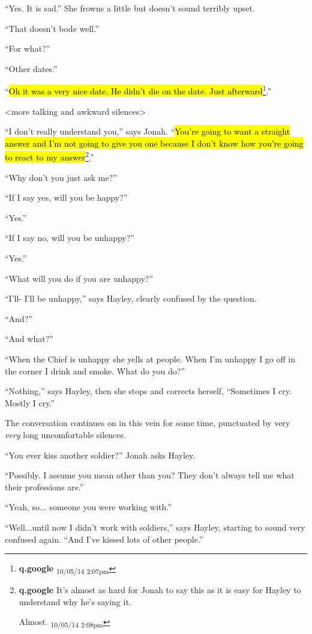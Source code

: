 ``Yes. It is sad.''  She frowns a little but doesn't sound terribly upset.

``That doesn't bode well.''

``For what?''

``Other dates.''

``\hl{Oh it was a very nice date.  He didn't die on the date.  Just afterward}\footnote{\textbf{q.google } \textsubscript{10/05/14 2:07pm}}.''

\textless more talking and awkward silences\textgreater 

``I don't really understand you,'' says Jonah.  ``\hl{You're going to want a straight answer and I'm not going to give you one because I don't know how you're going to react to my answer}\footnote{\textbf{q.google }It's almost as hard for Jonah to say this as it is easy for Hayley to understand why he's saying it.

Almost. \textsubscript{10/05/14 2:08pm}}.''

``Why don't you just ask me?''

``If I say yes, will you be happy?''

``Yes.''

``If I say no, will you be unhappy?''

``Yes.''

``What will you do if you are unhappy?''

``I'll- I'll be unhappy,'' says Hayley, clearly confused by the question.

``And?''

``And what?''

``When the Chief is unhappy she yells at people.  When I'm unhappy I go off in the corner I drink and smoke. What do you do?''

``Nothing,'' says Hayley, then she stops and corrects herself, ``Sometimes I cry.  Mostly I cry.''

The conversation continues on in this vein for some time, punctuated by very \textit{very }long uncomfortable silences.   

``You ever kiss another soldier?'' Jonah asks Hayley.

``Possibly.  I assume you mean other than you?  They don't always tell me what their professions are.''

``Yeah, so... someone you were working with.''

``Well...until now I didn't work with soldiers,'' says Hayley, starting to sound very confused again. ``And I've kissed lots of other people.''

